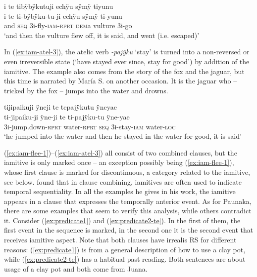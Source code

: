 \ea\label{ex:iam-atel-1}
\begingl
\glpreamble i te tibÿbÿkutuji echÿu sÿmÿ tiyunu\\
\gla i te ti-bÿbÿku-tu-ji echÿu sÿmÿ ti-yunu\\
\glb and \textsc{seq} 3i-fly-\textsc{iam}-\textsc{rprt} \textsc{dem}a vulture 3i-go\\
\glft ‘and then the vulture flew off, it is said, and went (i.e. escaped)’
\endgl
\trailingcitation{[jmx-n120429ls-x5.211]}
\xe

In (\ref{ex:iam-atel-3}), the atelic verb \textit{-pajÿku} ‘stay’ is turned into a non-reversed or even irreversible state (‘have stayed ever since, stay for good’) by addition of the iamitive. The example also comes from the story of the fox and the jaguar, but this time is narrated by María S. on another occasion. It is the jaguar who – tricked by the fox – jumps into the water and drowns. 

\ea\label{ex:iam-atel-3}
\begingl
\glpreamble tijipaikuji ÿneji te tepajÿkutu ÿneyae\\
\gla ti-jipaiku-ji ÿne-ji te ti-pajÿku-tu ÿne-yae\\
\glb 3i-jump.down-\textsc{rprt} water-\textsc{rprt} \textsc{seq} 3i-stay-\textsc{iam} water-\textsc{loc}\\
\glft ‘he jumped into the water and then he stayed in the water for good, it is said’
\endgl
\trailingcitation{[rxx-n120511l-1.039]}
\xe


(\ref{ex:iam-flee-1})--(\ref{ex:iam-atel-3}) all consist of two combined clauses, but the iamitive is only marked once – an exception possibly being (\ref{ex:iam-flee-1}), whose first clause is marked for discontinuous, a category related to the iamitive, see  below. \citet[39]{Olsson2013} found that in clause combining, iamitives are often used to indicate temporal sequentiality. In all the examples he gives in his work, the iamitive appears in a clause that expresses the temporally anterior event. As for Paunaka, there are some examples that seem to verify this analysis, while others contradict it. Consider (\ref{ex:predicate1}) and (\ref{ex:predicate2-te}). In the first of them, the first event in the sequence is marked, in the second one it is the second event that receives iamitive aspect. 
Note that both clauses have irrealis RS for different reasons: (\ref{ex:predicate1}) is from a general description of how to use a clay pot, while (\ref{ex:predicate2-te}) has a habitual past reading. Both sentences are about usage of a clay pot and both come from Juana.

